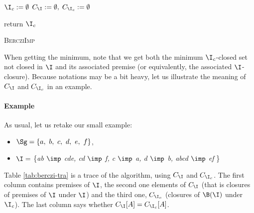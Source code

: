 \begin{algorithm}
	
	\BlankLine
	\BlankLine
	
	$\I_c := \emptyset$ \;
	$C_{\I} := \emptyset, \; C_{\I_c} := \emptyset $ \;
	

	\BlankLine
	

	\BlankLine
	
	return $\I_c$ \;
	
	\caption{\textsc{BercziImp}}
	\label{alg:Berczi-imp}
\end{algorithm}

When getting the minimum, note that we get both the minimum $\I_c$-closed set not closed in $\I$ and its associated premise (or equivalently, the associated $\I$-closure). Because notations may be a bit heavy, let us illustrate the meaning of $C_{\I}$ and $C_{\I_c}$ in an example.


\paragraph{Example} As usual, let us retake our small example:
\begin{itemize}
	\item $\Sg = \{a, \ b, \ c, \ d, \ e, \ f \}$,
	\item $\I =$ \{\textit{ab $\imp$ cde, cd $\imp$ f, c $\imp$ a, d $\imp$ b, 
		abcd $\imp$ ef} \} 
\end{itemize}
\noindent Table \ref{tab:berczi-tra} is a trace of the algorithm, using $C_{\I}$ and $C_{\I_c}$. The first column contains premises of $\I$, the second one elements of $C_{\I}$ (that is closures of premises of $\I$ under $\I$) and
the third one, $C_{\I_c}$ (closures of $\B(\I)$ under $\I_c$). The last column
says whether $C_{\I}[A] = C_{\I_c}[A]$.

